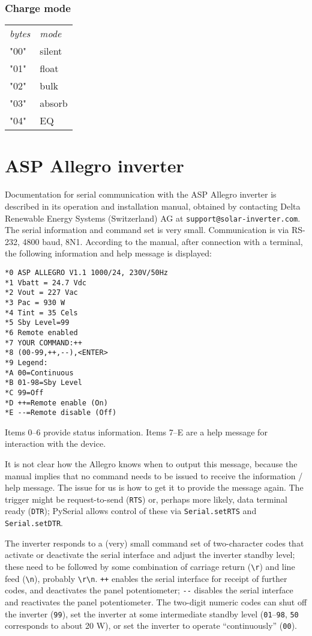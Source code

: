 \documentclass[pdftex,oneside,12pt,a4paper]{book}
\begin{document}
\subsubsection{Charge mode}
\begin{tabular}{ll}
\emph{\small bytes} & \emph{\small mode} \\
"00" & silent \\
"01" & float \\
"02" & bulk\\
"03" & absorb\\
"04" & EQ\\ 
\end{tabular}

\section{ASP Allegro inverter}
Documentation for serial communication with the ASP Allegro inverter is described in its operation and installation manual, obtained by contacting Delta Renewable Energy Systems (Switzerland) AG at \verb|support@solar-inverter.com|.  The serial information and command set is very small.  Communication is via RS-232, 4800 baud, 8N1.  According to the manual, after connection with a terminal, the following information and help message is displayed:
\begin{verbatim}
*0 ASP ALLEGRO V1.1 1000/24, 230V/50Hz
*1 Vbatt = 24.7 Vdc
*2 Vout = 227 Vac
*3 Pac = 930 W
*4 Tint = 35 Cels
*5 Sby Level=99
*6 Remote enabled
*7 YOUR COMMAND:++
*8 (00-99,++,--),<ENTER>
*9 Legend:
*A 00=Continuous
*B 01-98=Sby Level
*C 99=Off
*D ++=Remote enable (On)
*E --=Remote disable (Off)
\end{verbatim}
Items 0--6 provide status information.  Items 7--E are a help message for interaction with the device.

It is not clear how the Allegro knows when to output this message, because the manual implies that no command needs to be issued to receive the information / help message.  The issue for us is how to get it to provide the message again.  The trigger might be request-to-send (\verb|RTS|) or, perhaps more likely, data terminal ready (\verb|DTR|); PySerial allows control of these via \verb|Serial.setRTS| and \verb|Serial.setDTR|.

The inverter responds to a (very) small command set of two-character codes that activate or deactivate the serial interface and adjust the inverter standby level; these need to be followed by some combination of carriage return (\verb|\r|) and line feed (\verb|\n|), probably \verb|\r\n|.  \verb|++| enables the serial interface for receipt of further codes, and deactivates the panel potentiometer; \verb|--| disables the serial interface and reactivates the panel potentiometer.  The two-digit numeric codes can shut off the inverter (\verb|99|), set the inverter at some intermediate standby level (\verb|01|--\verb|98|, \verb|50| corresponds to about 20 W), or set the inverter to operate ``continuously'' (\verb|00|).
\end{document}
